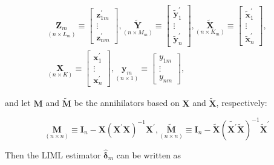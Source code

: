 \documentclass[10pt]{article}
\begin{document}
\[
\begin{array}{r}
\underset{\left(n \times L_{m}\right)}{\mathbf{Z}_{m}} \equiv\left[\begin{array}{c}
\mathbf{z}_{1 m}^{\prime} \\
\vdots \\
\mathbf{z}_{n m}^{\prime}
\end{array}\right], \underset{\left(n \times M_{m}\right)}{\widetilde{\mathbf{Y}}} \equiv\left[\begin{array}{c}
\tilde{\mathbf{y}}_{1}^{\prime} \\
\vdots \\
\tilde{\mathbf{y}}_{n}^{\prime}
\end{array}\right], \underset{\left(n \times K_{m}\right)}{\widetilde{\mathbf{X}}} \equiv\left[\begin{array}{c}
\tilde{\mathbf{x}}_{1}^{\prime} \\
\vdots \\
\tilde{\mathbf{x}}_{n}^{\prime}
\end{array}\right], \\
\underset{(n \times K)}{\mathbf{X}} \equiv\left[\begin{array}{c}
\mathbf{x}_{1}^{\prime} \\
\vdots \\
\mathbf{x}_{n}^{\prime}
\end{array}\right], \underset{(n \times 1)}{\mathbf{y}_{m}} \equiv\left[\begin{array}{c}
y_{1 m} \\
\vdots \\
y_{n m}
\end{array}\right], \tag{8.6.7}
\end{array}
\]

and let $\mathbf{M}$ and $\tilde{\mathbf{M}}$ be the annihilators based on $\mathbf{X}$ and $\tilde{\mathbf{X}}$, respectively:


\begin{equation*}
\underset{(n \times n)}{\mathbf{M}} \equiv \mathbf{I}_{n}-\mathbf{X}\left(\mathbf{X}^{\prime} \mathbf{X}\right)^{-1} \mathbf{X}^{\prime}, \underset{(n \times n)}{\tilde{\mathbf{M}}} \equiv \mathbf{I}_{n}-\widetilde{\mathbf{X}}\left(\widetilde{\mathbf{X}^{\prime}} \widetilde{\mathbf{X}}\right)^{-1} \widetilde{\mathbf{X}}^{\prime} \tag{8.6.8}
\end{equation*}


Then the LIML estimator $\hat{\boldsymbol{\delta}}_{m}$ can be written as
\end{document}

